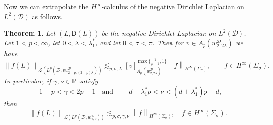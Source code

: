 \documentclass[12pt,a4paper, reqno]{amsart}
\theoremstyle{plain}
\newtheorem{theorem}{Theorem}[section]
\theoremstyle{definition}
\theoremstyle{remark}
\numberwithin{equation}{section}
\newcommand{\1}{\mathbbm{1}}
\newcommand{\R}{\ensuremath{\mathbb{R}}}
\newcommand{\calD}{\ensuremath{\mathcal{D}}}
\newcommand{\sL}{\ensuremath{\mathscr{L}}}
\newcommand{\sfD}{\ensuremath{\mathsf{D}}}
\newcommand{\scrL}{\ensuremath{\mathscr{L}}}
\newcommand{\nrm}[1]{\left\lVert #1 \right\rVert}
\begin{document}
Now we can extrapolate the $H^\infty$-calculus of the negative Dirichlet Laplacian on $L^2(\calD)$ as follows.

\begin{theorem}\label{functional:calculus:laplace:wedge:Muckenhoupt}
Let $(L,\sfD(L))$ be the negative Dirichlet Laplacian on $L^2(\calD)$. Let $1<p<\infty$, let $\displaystyle 0<\lambda<\lambda_1^*$, and let $0<\sigma<\pi$. Then for $v\in A_p( w_{2,2\lambda}^\calD)$ we have
\begin{equation}\label{eq:extrapol:ApGeneral}
\nrm{f(L)}_{\scrL(L^p(\calD,v w_{2-p,(2-p)\lambda}^\calD))}
\lesssim_{p,\sigma,\lambda} 
[v]_{A_p( w_{2,2\lambda}^\calD)}^{\max\{\frac{1}{p-1},1\}}\nrm{f}_{H^\infty(\Sigma_\sigma)},\qquad f\in H^\infty(\Sigma_\sigma).
\end{equation}
In particular, if $\gamma,\nu \in\R$ satisfy
\begin{equation}\label{eq:extrapol:range}
-1-p < \gamma < 2p-1\quad\text{and}\quad-d-\lambda_1^*p < \nu < (d+\lambda_1^*)p-d,
\end{equation}
then
\begin{equation}\label{eq:extrapol:ApPower}
\nrm{f(L)}_{\sL(L^p(\calD, w_{\gamma,\nu}^\calD))}\lesssim_{ p,\sigma,\gamma,\nu} \nrm{f}_{H^\infty(\Sigma_\sigma)}, \quad f\in H^\infty(\Sigma_\sigma).
\end{equation}
\end{theorem}
\end{document}
